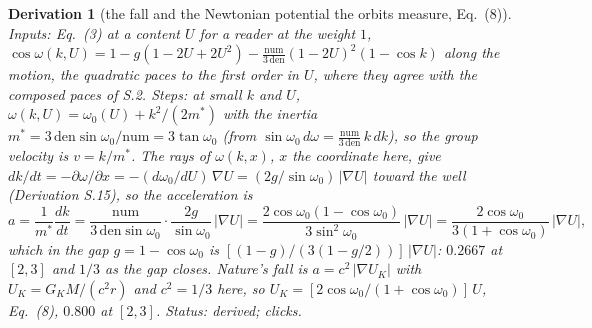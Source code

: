 \documentclass[pdflatex,sn-mathphys-num]{sn-jnl}
\newcommand{\num}{\mathrm{num}}
\newcommand{\den}{\mathrm{den}}
\theoremstyle{thmstyleone}
\newtheorem{derivation}{Derivation}
\begin{document}
\begin{derivation}[the fall and the Newtonian potential the orbits measure, Eq.~(8)]
\emph{Inputs:} Eq.~(3) at a content $U$ for a reader at the weight $1$, $\cos\omega(k, U) = 1 - g(1 - 2U + 2U^2) - \frac{\num}{3\,\den}(1 - 2U)^2(1 - \cos k)$ along the motion, the quadratic paces to the first order in $U$, where they agree with the composed paces of S.2. \emph{Steps:} at small $k$ and $U$, $\omega(k, U) = \omega_0(U) + k^2 / (2m^*)$ with the inertia $m^* = 3\,\den\sin\omega_0 / \num = 3\tan\omega_0$ (from $\sin\omega_0\,d\omega = \frac{\num}{3\,\den}\,k\,dk$), so the group velocity is $v = k / m^*$. The rays of $\omega(k, x)$, $x$ the coordinate here, give $dk / dt = -\partial\omega / \partial x = -(d\omega_0 / dU)\,\nabla U = (2g / \sin\omega_0)\,|\nabla U|$ toward the well (Derivation S.15), so the acceleration is
\[
a = \frac{1}{m^*}\frac{dk}{dt} = \frac{\num}{3\,\den\sin\omega_0}\cdot\frac{2g}{\sin\omega_0}\,|\nabla U|
= \frac{2\cos\omega_0(1 - \cos\omega_0)}{3\sin^2\omega_0}\,|\nabla U| = \frac{2\cos\omega_0}{3(1 + \cos\omega_0)}\,|\nabla U|,
\]
which in the gap $g = 1 - \cos\omega_0$ is $[(1 - g) / (3(1 - g / 2))]\,|\nabla U|$: $0.2667$ at $[2, 3]$ and $1 / 3$ as the gap closes. Nature's fall is $a = c^2\,|\nabla U_K|$ with $U_K = G_K M / (c^2 r)$ and $c^2 = 1 / 3$ here, so $U_K = [2\cos\omega_0 / (1 + \cos\omega_0)]\,U$, Eq.~(8), $0.800$ at $[2, 3]$.
 \emph{Status:} derived; clicks.
\end{derivation}
\end{document}
